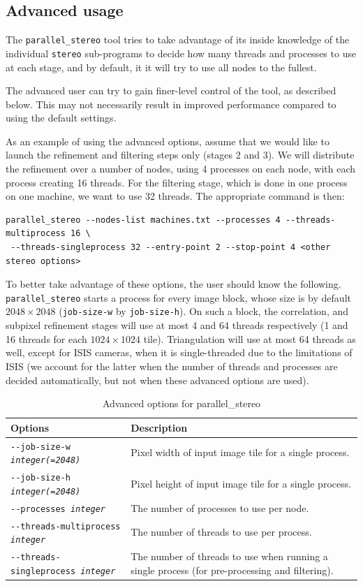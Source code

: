 \subsection{Advanced usage}

The \texttt{parallel\_stereo} tool tries to take advantage of its inside
knowledge of the individual \texttt{stereo} sub-programs to decide
how many threads and processes to use at each stage, and by default, it
it will try to use all nodes to the fullest.

The advanced user can try to gain finer-level control of the tool, as
described below. This may not necessarily result in improved performance
compared to using the default settings.

As an example of using the advanced options, assume that we would like
to launch the refinement and filtering steps only (stages 2 and 3). We
will distribute the refinement over a number of nodes, using 4 processes
on each node, with each process creating 16 threads. For the filtering
stage, which is done in one process on one machine, we want to use 32
threads. The appropriate command is then:

\begin{verbatim}
parallel_stereo --nodes-list machines.txt --processes 4 --threads-multiprocess 16 \
 --threads-singleprocess 32 --entry-point 2 --stop-point 4 <other stereo options>
\end{verbatim}

To better take advantage of these options, the user should know the following.
\texttt{parallel\_stereo} starts a process for every image block, whose
size is by default $2048 \times 2048$ (\texttt{job-size-w} by
\texttt{job-size-h}). On such a block, the correlation, and subpixel
refinement stages will use at most 4 and 64 threads respectively (1 and
16 threads for each $1024 \times 1024$ tile). Triangulation will use at
most 64 threads as well, except for ISIS cameras, when it is
single-threaded due to the limitations of ISIS (we account for the
latter when the number of threads and processes are decided
automatically, but not when these advanced options are used).

\begin{longtable}{|l|p{7.5cm}|}
\caption{Advanced options for parallel\_stereo}
\label{tbl:advancedparallelstereo}
\endfirsthead
\endhead
\endfoot
\endlastfoot
\hline
Options & Description \\ \hline \hline
\texttt{-\/-job-size-w \textit{integer(=2048)}} & Pixel width of input
image tile for a single process. \\ \hline
\texttt{-\/-job-size-h \textit{integer(=2048)}} & Pixel height of input
image tile for a single process. \\ \hline
\texttt{-\/-processes \textit{integer}} & The number of processes to
use per node. \\ \hline
\texttt{-\/-threads-multiprocess \textit{integer}} & The number of threads to use per process.\\ \hline
\texttt{-\/-threads-singleprocess \textit{integer}} & The number of threads to use when running a single process (for pre-processing and filtering).\\ \hline
\end{longtable}

